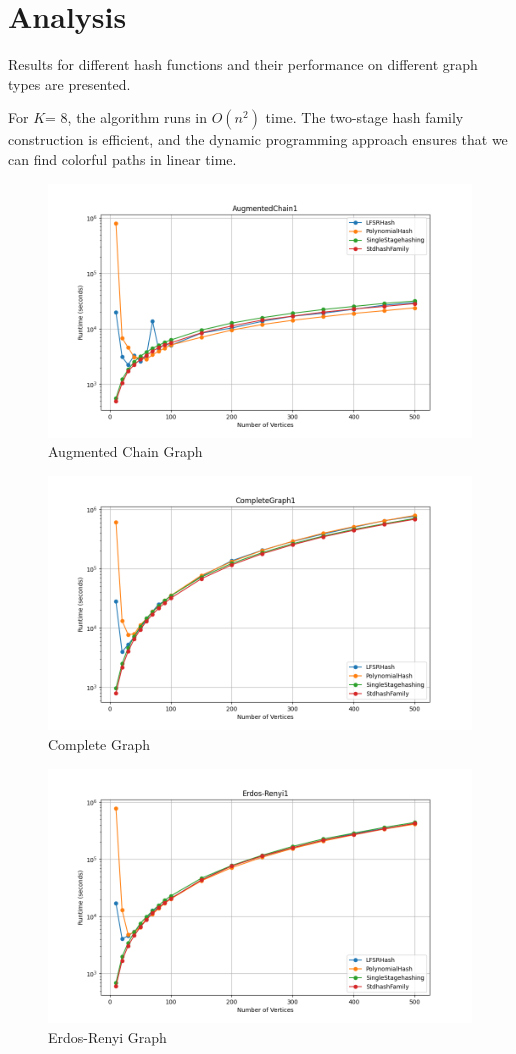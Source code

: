 \documentclass{article}
\begin{document}
\section{Analysis}
Results for different hash functions and their performance on different graph types are presented. 

For $K$= 8, the algorithm runs in $O(n^2)$ time. The two-stage hash family construction is efficient, and the dynamic programming approach ensures that we can find colorful paths in linear time.

\begin{figure}[H]
    \centering
    \includegraphics[width=0.8\linewidth]{figures/AugmentedChain1(fixedK).png}
    \caption{Augmented Chain Graph}
    \label{fig:AugmentedChain1}
\end{figure}

\begin{figure}[H]
    \centering
    \includegraphics[width=0.8\linewidth]{figures/CompleteGraph1(fixedK).png}
    \caption{Complete Graph}
    \label{fig:CompleteGraph1}
\end{figure}

\begin{figure}[H]
    \centering
    \includegraphics[width=0.8\linewidth]{figures/Erdos-Renyi1(fixedK).png}
    \caption{Erdos-Renyi Graph}
    \label{fig:ErdosRenyi1}
\end{figure}
\end{document}
